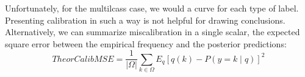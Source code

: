 Unfortunately, for the multilcass case, we would a curve for each type of label. Presenting calibration in such a way is not helpful for drawing conclusions. Alternatively, we can summarize miscalibration in a single scalar, the expected square error between the empirical frequency and the posterior predictions:
$$TheorCalibMSE = \frac{1}{|\Omega|}\sum_{k \in \Omega}{E_{q}[q(k) - P(y = k \mid q)]^2}$$



